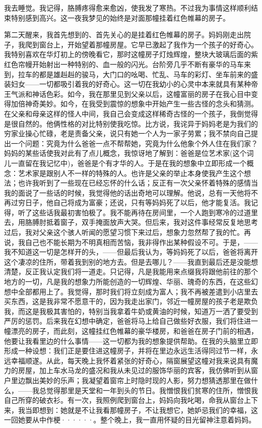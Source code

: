 \documentclass[12pt, UTF8]{ctexbook}
\begin{document}
我去睡觉。我记得，胳膊疼得愈来愈凶，使我发了寒热。不过我为事情这样顺利结束特别感到高兴。这一夜我梦见的始终是对面那幢挂着红色帷幕的房子。
\par 第二天醒来，我首先想到的、首先关心的是挂着红色帷幕的房子。妈妈刚走出院子，我爬到窗台上，开始望着那幢房屋。它早已激起了我作为一个孩子的好奇心。我特别喜欢在华灯初上的傍晚看它，那时这幢房子灯烛辉煌，整块大玻璃后面的紫红色帘幔开始射出一种特别的、血一般的闪光。台阶旁几乎不断有豪华的马车来到，拉车的都是雄赳赳的骏马，大门口的吆喝、忙乱、马车的彩灯、坐车前来的盛装妇女——一切都吸引着我的好奇心。这一切在我幼小的心灵中本来就具有某种帝王气派和神话色彩。如今，我在那里见到父亲以后，这幢富丽的房子在我心目中变得加倍神奇美妙。如今，在我受到震惊的想象中开始产生一些古怪的念头和猜测。在父亲和母亲这样的怪人中间，我自己会变成这样稀奇古怪的一个孩子，我倒觉得是很自然的。他俩性格的对比特别使我吃惊。比方说，我诧异于妈妈老是为我们的穷家业操心忙碌，老是责备父亲，说只有她一个人为一家子劳累；我不禁向自己提出一个问题：究竟为什么爸爸一点不帮帮她，究竟为什么他象个外人住在我们家？妈妈的某些话使我对此有了点儿概念，我惊讶地了解到：爸爸是位艺术家(这个词儿一直留在我记忆中)，爸爸是个有才华的人。于是在我的想象中立即形成一个概念：艺术家是跟别人不一样的特殊的人。也许是父亲的举止本身使我产生这个想法；也许我听到了一些现在已经忘怀的什么话；反正有一次父亲怀着特殊的感情当我的面说了一些话的时候，我觉得他的话出奇地可以理解。他说，总有一天他将不再过穷日子，他自己将成为富豪；还说，只有等妈妈死了以后，他才能复活。我记得，听了这些话我最初害怕极了。我不能再待在房间里，一个人跑到寒冷的过道里去，用胳膊肘抵着窗子，双手掩面放声大哭。但后来，我对这件事经常反复地思考过后，我对父亲这个骇人听闻的愿望习惯下来过后，想象力忽然帮了我的忙。再说，我自己也不能长期为不明真相而苦恼，我非得作出某种假设不可。于是，——我不知道这一切是怎样开的头，——但最后我认为，等妈妈死了以后，爸爸将离开这个凄凉的住所，带着我到别的地方去。但是去哪儿？——我直到最后还是没能想清楚，反正我认定我们将一道走。只记得，凡是我能用来点缀我将跟他前往的那个地方的一切，凡是我的想象力所能创造的一切辉煌、华丽、瑰奇的东西，在这些幻想中全部都用上了。我觉得，那时我们将立刻成为富人；我不再被差遣到小店里去买东西，这是我非常不愿意干的，因为我走出家门，邻近一幢房屋的孩子老是欺负我，而这是我极其害怕的，特别当我拿着牛奶或黄油的时候，知道万一洒了要受到严厉的惩罚。后来我在幻想中确定，爸爸将马上给自己做些好衣服，我们将住进一幢漂亮的房子，而此刻，这幢挂红色帷幕的豪华楼房，和爸爸在房子门前的相遇，他要让我看里边的什么事情——这一切都为我的想象提供帮助。在我的头脑里立即形成一种设想：我们正是要住进这幢房子，并将在里边永远生活得同过节一样，永远幸福顺遂。从此，每天晚上我怀着紧张的好奇心，隔窗展望这幢对我来说具有魔力的房屋，加上车水马龙的盛况和我从未见过的服饰华丽的宾客，我仿佛听到从窗户里边飘出美妙的乐声；我凝望着窗帘上时隐时现的人影，努力想猜透那里在做什么，——我总觉得那里是天堂和一年到头的节日。我憎恨我们贫寒的住所，憎恨我自己所穿的破衣衫。有一次，我照例爬到窗台上，妈妈向我叱喝，命我从窗台上下来，我当即想到：她就是不让我看那幢房子，不让我想它，她妒忌我们的幸福，这一回她要从中作梗······。整个晚上，我一直用怀疑的目光留神注意着妈妈。
\end{document}
